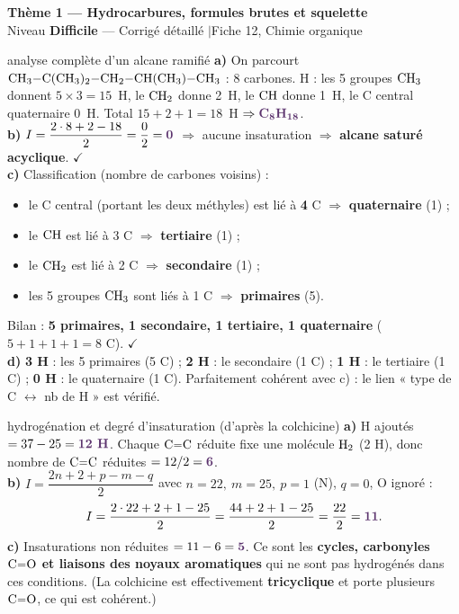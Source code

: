 \documentclass[11pt,a4paper]{article}
\newcommand{\rep}[1]{\textcolor{primarydark}{\textbf{#1}}}
\newcommand{\banner}[2]{%
\begin{tcolorbox}[enhanced,colback=excol,colframe=excol,arc=5pt,boxrule=0pt,
   left=5mm,right=5mm,top=2.5mm,bottom=2.5mm,coltext=white]
{\large\bfseries #1}\\[1pt]{\small #2}
\end{tcolorbox}\vspace{2pt}}
\begin{document}
\banner{Thème 1 — Hydrocarbures, formules brutes et squelette}{Niveau \textbf{Difficile} — Corrigé détaillé \quad$\vert$\quad Fiche 12, Chimie organique}

\begin{corr}{analyse complète d'un alcane ramifié}
\textbf{a)} On parcourt $\ce{CH3-C(CH3)2-CH2-CH(CH3)-CH3}$ : 8 carbones. H : les 5 groupes $\ce{CH3}$ donnent $5\times3=15$~H, le $\ce{CH2}$ donne 2~H, le $\ce{CH}$ donne 1~H, le C central quaternaire 0~H. Total $15+2+1=18$~H $\Rightarrow \rep{\ce{C8H18}}$.\\
\textbf{b)} $I=\dfrac{2\cdot8+2-18}{2}=\dfrac{0}{2}=\rep{0}$ $\Rightarrow$ aucune insaturation $\Rightarrow$ \rep{alcane saturé acyclique}. $\checkmark$\\
\textbf{c)} Classification (nombre de carbones voisins) :
\begin{itemize}[leftmargin=1.6em,itemsep=0pt]
  \item le C central (portant les deux méthyles) est lié à \textbf{4} C $\Rightarrow$ \rep{quaternaire} (1) ;
  \item le $\ce{CH}$ est lié à 3 C $\Rightarrow$ \rep{tertiaire} (1) ;
  \item le $\ce{CH2}$ est lié à 2 C $\Rightarrow$ \rep{secondaire} (1) ;
  \item les 5 groupes $\ce{CH3}$ sont liés à 1 C $\Rightarrow$ \rep{primaires} (5).
\end{itemize}
Bilan : \rep{5 primaires, 1 secondaire, 1 tertiaire, 1 quaternaire} ($5+1+1+1=8$ C). $\checkmark$\\
\textbf{d)} \rep{3 H} : les 5 primaires (5 C) ; \rep{2 H} : le secondaire (1 C) ; \rep{1 H} : le tertiaire (1 C) ; \rep{0 H} : le quaternaire (1 C). Parfaitement cohérent avec c) : le lien « type de C $\leftrightarrow$ nb de H » est vérifié.
\end{corr}

\begin{corr}{hydrogénation et degré d'insaturation (d'après la colchicine)}
\textbf{a)} H ajoutés $= 37-25 = \rep{12\ \text{H}}$. Chaque $\ce{C=C}$ réduite fixe une molécule $\ce{H2}$ (2 H), donc nombre de $\ce{C=C}$ réduites $= 12/2 = \rep{6}$.\\
\textbf{b)} $I=\dfrac{2n+2+p-m-q}{2}$ avec $n=22,\ m=25,\ p=1$ (N), $q=0$, O ignoré :
\[ I=\frac{2\cdot22+2+1-25}{2}=\frac{44+2+1-25}{2}=\frac{22}{2}=\rep{11}. \]
\textbf{c)} Insaturations non réduites $= 11-6 = \rep{5}$. Ce sont les \rep{cycles, carbonyles $\ce{C=O}$ et liaisons des noyaux aromatiques} qui ne sont pas hydrogénés dans ces conditions. (La colchicine est effectivement \textbf{tricyclique} et porte plusieurs $\ce{C=O}$, ce qui est cohérent.)
\end{corr}
\end{document}
